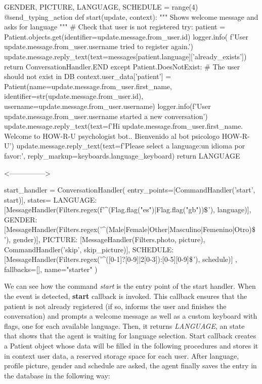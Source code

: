 \documentclass[12pt,english]{article}
\newcommand{\dollar}{\mbox{\textdollar}}
\begin{document}
\begin{python}[caption={Patient start callback}, captionpos=b]
GENDER, PICTURE, LANGUAGE, SCHEDULE = range(4)
@send_typing_action
def start(update, context):
    """
    Shows welcome message and asks for language
    """
    # Check that user is not registered
    try:
        patient = Patient.objects.get(identifier=update.message.from_user.id)
        logger.info(
            f'User {update.message.from_user.username} tried to register again.')
        update.message.reply_text(text=messages[patient.language]['already_exists'])
        return ConversationHandler.END
    except Patient.DoesNotExist:
        # The user should not exist in DB
        context.user_data['patient'] = Patient(name=update.message.from_user.first_name, identifier=str(update.message.from_user.id), username=update.message.from_user.username)
        logger.info(f'User {update.message.from_user.username} started a new conversation')
        update.message.reply_text(text=f'Hi {update.message.from_user.first_name}. Welcome to HOW-R-U psychologist bot.. Bienvenido al bot psicologo HOW-R-U')
        update.message.reply_text(text=f'Please select a language:\nElija un idioma por favor:', reply_markup=keyboards.language_keyboard)
    return LANGUAGE

  <--------------->

  start_handler = ConversationHandler(
      entry_points=[CommandHandler('start', start)],
      states={
          LANGUAGE: [MessageHandler(Filters.regex(f'^({Flag.flag("es")}|{Flag.flag("gb")})$\dollar$'), language)],
          GENDER: [MessageHandler(Filters.regex('^(Male|Female|Other|Masculino|Femenino|Otro)$\dollar$'), gender)],
          PICTURE: [MessageHandler(Filters.photo, picture), CommandHandler('skip', skip_picture)],
          SCHEDULE: [MessageHandler(Filters.regex('^([0-1]?[0-9]|2[0-3]):[0-5][0-9]$\dollar$'), schedule)]
      },
      fallbacks=[],
      name="starter"
  )
\end{python}

We can see how the command \emph{start} is the entry point of the start handler. When the event is detected, \textbf{start} callback is invoked. This callback ensures that the patient is not already registered (if so, informs the user and finishes the conversation) and prompts a welcome message as well as a custom keyboard with flags, one for each available language. Then, it returns \emph{LANGUAGE}, an state that shows that the agent is waiting for language selection. Start callback creates a Patient object whose data will be filled in the following procedures and stores it in context user data, a reserved storage space for each user. After language, profile picture, gender and schedule are asked, the agent finally saves the entry in the database in the following way:
\end{document}
